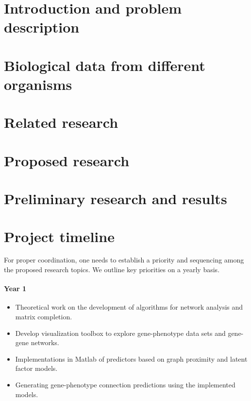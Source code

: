\documentclass[11pt]{article}
\begin{document}

\newpage
\section{Introduction and problem description}



\section{Biological data from different organisms}
\label{sec:dataDescription}


\section{Related research}


\section{Proposed research}
\label{sec:proposedResearch}



\vspace{-3ex}
\section{Preliminary research and results}
\label{sec:preliminaryResearch}


\vspace{-2ex}
\section{Project timeline}
For proper coordination, one needs to establish a priority and sequencing among the proposed research topics. We outline key priorities on a yearly basis.

\vspace*{-3ex}
\paragraph*{Year 1}
\begin{itemize}
 \item Theoretical work on the development of algorithms for network analysis and matrix completion.
 \item Develop visualization toolbox to explore gene-phenotype data sets and gene-gene networks.
 \item Implementations in Matlab of predictors based on graph proximity and latent factor models.
 \item Generating gene-phenotype connection predictions using the implemented models.
\end{itemize}
\end{document}

